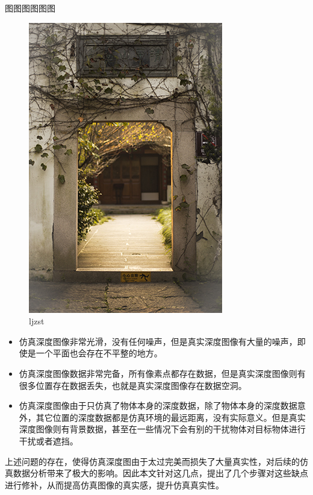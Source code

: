 图图图图图图
\begin{figure}[htb]
	\centering 
	\includegraphics[scale=1.0]{./Pictures/test.jpg} 
	\caption{ljzst} 
\end{figure}
\begin{itemize}
\item 仿真深度图像非常光滑，没有任何噪声，但是真实深度图像有大量的噪声，即使是一个平面也会存在不平整的地方。
\item 仿真深度图像数据非常完备，所有像素点都存在数据，但是真实深度图像则有很多位置存在数据丢失，也就是真实深度图像存在数据空洞。
\item 仿真深度图像由于只仿真了物体本身的深度数据，除了物体本身的深度数据意外，其它位置的深度数据都是仿真环境的最远距离，没有实际意义。但是真实深度图像则有背景数据，甚至在一些情况下会有别的干扰物体对目标物体进行干扰或者遮挡。
\end{itemize}
上述问题的存在，使得仿真深度图由于太过完美而损失了大量真实性，对后续的仿真数据分析带来了极大的影响。因此本文针对这几点，提出了几个步骤对这些缺点进行修补，从而提高仿真图像的真实感，提升仿真真实性。

